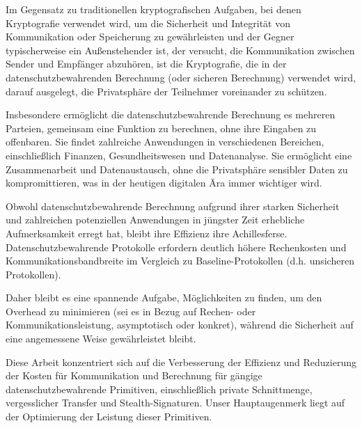 Im Gegensatz zu traditionellen kryptografischen Aufgaben, bei denen Kryptografie verwendet wird, um die Sicherheit und Integrit\"at von Kommunikation oder Speicherung zu gew\"ahrleisten und der Gegner typischerweise ein Außenstehender ist, der versucht, die Kommunikation zwischen Sender und Empf\"anger abzuhören, ist die Kryptografie, die in der datenschutzbewahrenden Berechnung (oder sicheren Berechnung) verwendet wird, darauf ausgelegt, die Privatsph\"are der Teilnehmer voreinander zu schützen.

Insbesondere ermöglicht die datenschutzbewahrende Berechnung es mehreren Parteien, gemeinsam eine Funktion zu berechnen, ohne ihre Eingaben zu offenbaren. Sie findet zahlreiche Anwendungen in verschiedenen Bereichen, einschließlich Finanzen, Gesundheitswesen und Datenanalyse. Sie ermöglicht eine Zusammenarbeit und Datenaustausch, ohne die Privatsph\"are sensibler Daten zu kompromittieren, was in der heutigen digitalen \"Ara immer wichtiger wird.

Obwohl datenschutzbewahrende Berechnung aufgrund ihrer starken Sicherheit und zahlreichen potenziellen Anwendungen in jüngster Zeit erhebliche Aufmerksamkeit erregt hat, bleibt ihre Effizienz ihre Achillesferse. Datenschutzbewahrende Protokolle erfordern deutlich h\"ohere Rechenkosten und Kommunikationsbandbreite im Vergleich zu Baseline-Protokollen (d.h. unsicheren Protokollen).

\begin{sloppypar}
Daher bleibt es eine spannende Aufgabe, M\"oglichkeiten zu finden, um den Overhead zu minimieren (sei es in Bezug auf Rechen- oder Kommunikationsleistung, asymptotisch oder konkret), w\"ahrend die Sicherheit auf eine angemessene Weise gew\"ahrleistet bleibt.
\end{sloppypar}

Diese Arbeit konzentriert sich auf die Verbesserung der Effizienz und Reduzierung der Kosten für Kommunikation und Berechnung für g\"angige datenschutzbewahrende Primitiven, einschließlich private Schnittmenge, vergesslicher Transfer und Stealth-Signaturen. Unser Hauptaugenmerk liegt auf der Optimierung der Leistung dieser Primitiven.